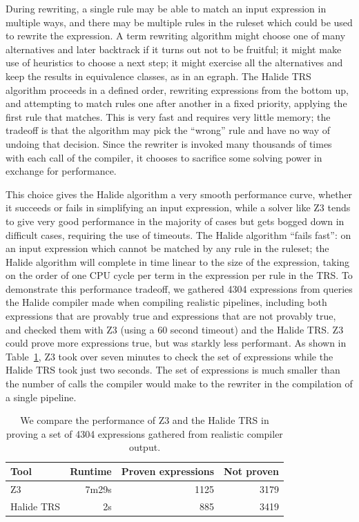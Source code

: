 \documentclass[acmsmall,review,anonymous]{acmart}\settopmatter{printfolios=true,printccs=false,printacmref=false}
\begin{document}
During rewriting, a single rule may be able to match an input expression in multiple ways, and there may be multiple rules in the ruleset which could be used to rewrite the expression. A term rewriting algorithm might choose one of many alternatives and later backtrack if it turns out not to be fruitful; it might make use of heuristics to choose a next step; it might exercise all the alternatives and keep the results in equivalence classes, as in an egraph. The Halide TRS algorithm proceeds in a defined order, rewriting expressions from the bottom up, and attempting to match rules one after another in a fixed priority, applying the first rule that matches. This is very fast and requires very little memory; the tradeoff is that the algorithm may pick the ``wrong'' rule and have no way of undoing that decision. Since the rewriter is invoked many thousands of times with each call of the compiler, it chooses to sacrifice some solving power in exchange for performance.

This choice gives the Halide algorithm a very smooth performance curve, whether it succeeds or fails in simplifying an input expression, while a solver like Z3 tends to give very good performance in the majority of cases but gets bogged down in difficult cases, requiring the use of timeouts. The Halide algorithm ``fails fast'': on an input expression which cannot be matched by any rule in the ruleset; the Halide algorithm will complete in time linear to the size of the expression, taking on the order of one CPU cycle per term in the expression per rule in the TRS. To demonstrate this performance tradeoff, we gathered 4304 expressions from queries the Halide compiler made when compiling realistic pipelines, including both expressions that are provably true and expressions that are not provably true, and checked them with Z3 (using a 60 second timeout) and the Halide TRS. Z3 could prove more expressions true, but was starkly less performant. As shown in Table~\ref{tab:simplifiervsz3}, Z3 took over seven minutes to check the set of expressions while the Halide TRS took just two seconds. The set of expressions is much smaller than the number of calls the compiler would make to the rewriter in the compilation of a single pipeline.

\begin{table}
\caption{We compare the performance of Z3 and the Halide TRS in proving a set of 4304 expressions gathered from realistic compiler output.}
\begin{tabular}{l|r|r|r}
Tool & Runtime & Proven expressions & Not proven \\
\hline
Z3 & 7m29s & 1125 & 3179 \\
Halide TRS & 2s & 885 & 3419 
\end{tabular}
\label{tab:simplifiervsz3}
\end{table}
\end{document}
